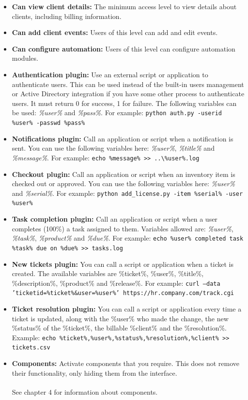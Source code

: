 \documentclass[11pt]{article}
\begin{document}
\begin{itemize}
\item \textbf{Can view client details:} The minimum access level to view details about clients, including billing information.
\item \textbf{Can add client events:} Users of this level can add and edit events.
\item \textbf{Can configure automation:} Users of this level can configure automation modules.
\item \textbf{Authentication plugin:} Use an external script or application to authenticate users. This can be used instead of the built-in users management or Active Directory integration if you have some other process to authenticate users. It must return 0 for success, 1 for failure. The following variables can be used: \textit{\%user\%} and \textit{\%pass\%}. For example: \texttt{python auth.py -userid \%user\% -passwd \%pass\%}
\item \textbf{Notifications plugin:} Call an application or script when a notification is sent. You can use the following variables here: \textit{\%user\%}, \textit{\%title\%} and \textit{\%message\%}. For example: \texttt{echo \%message\% >> ..\textbackslash \%user\%.log}
\item \textbf{Checkout plugin:} Call an application or script when an inventory item is checked out or approved. You can use the following variables here: \textit{\%user\%} and \textit{\%serial\%}. For example: \texttt{python add\_license.py -item \%serial\% -user \%user\%}
\item \textbf{Task completion plugin:} Call an application or script when a user completes (100\%) a task assigned to them. Variables allowed are: \textit{\%user\%}, \textit{\%task\%}, \textit{\%product\%} and \textit{\%due\%}. For example: \texttt{echo \%user\% completed task \%task\% due on \%due\% >> tasks.log}
\item \textbf{New tickets plugin:} You can call a script or application when a ticket is created. The available variables are \%ticket\%, \%user\%, \%title\%, \%description\%, \%product\% and \%release\%. For example: \texttt{curl --data 'ticketid=\%ticket\%\&user=\%user\%' https://hr.company.com/track.cgi}
\item \textbf{Ticket resolution plugin:} You can call a script or application every time a ticket is updated, along with the \%user\% who made the change, the new \%status\% of the \%ticket\%, the billable \%client\% and the \%resolution\%. Example: \texttt{echo \%ticket\%,\%user\%,\%status\%,\%resolution\%,\%client\% >> tickets.csv}
\item \textbf{Components:} Activate components that you require. This does not remove their functionality, only hiding them from the interface.\\\\See chapter 4 for information about components.
\end{itemize}
\end{document}

